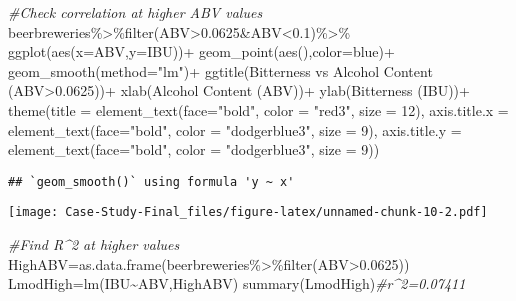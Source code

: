 \documentclass[
]{article}
\newenvironment{Shaded}{\begin{snugshade}}{\end{snugshade}}
\newcommand{\AttributeTok}[1]{\textcolor[rgb]{0.77,0.63,0.00}{#1}}
\newcommand{\CommentTok}[1]{\textcolor[rgb]{0.56,0.35,0.01}{\textit{#1}}}
\newcommand{\DecValTok}[1]{\textcolor[rgb]{0.00,0.00,0.81}{#1}}
\newcommand{\FloatTok}[1]{\textcolor[rgb]{0.00,0.00,0.81}{#1}}
\newcommand{\FunctionTok}[1]{\textcolor[rgb]{0.00,0.00,0.00}{#1}}
\newcommand{\NormalTok}[1]{#1}
\newcommand{\OtherTok}[1]{\textcolor[rgb]{0.56,0.35,0.01}{#1}}
\newcommand{\SpecialCharTok}[1]{\textcolor[rgb]{0.00,0.00,0.00}{#1}}
\newcommand{\StringTok}[1]{\textcolor[rgb]{0.31,0.60,0.02}{#1}}
\begin{document}
\begin{Shaded}
\begin{Highlighting}[]
\CommentTok{\#Check correlation at higher ABV values}
\NormalTok{beerbreweries}\SpecialCharTok{\%\textgreater{}\%}\FunctionTok{filter}\NormalTok{(ABV}\SpecialCharTok{\textgreater{}}\FloatTok{0.0625}\SpecialCharTok{\&}\NormalTok{ABV}\SpecialCharTok{\textless{}}\FloatTok{0.1}\NormalTok{)}\SpecialCharTok{\%\textgreater{}\%}
  \FunctionTok{ggplot}\NormalTok{(}\FunctionTok{aes}\NormalTok{(}\AttributeTok{x=}\NormalTok{ABV,}\AttributeTok{y=}\NormalTok{IBU))}\SpecialCharTok{+}
  \FunctionTok{geom\_point}\NormalTok{(}\FunctionTok{aes}\NormalTok{(),}\AttributeTok{color=}\StringTok{\textquotesingle{}blue\textquotesingle{}}\NormalTok{)}\SpecialCharTok{+}
  \FunctionTok{geom\_smooth}\NormalTok{(}\AttributeTok{method=}\StringTok{"lm"}\NormalTok{)}\SpecialCharTok{+}
  \FunctionTok{ggtitle}\NormalTok{(}\StringTok{\textquotesingle{}Bitterness vs Alcohol Content (ABV\textgreater{}0.0625)\textquotesingle{}}\NormalTok{)}\SpecialCharTok{+}
  \FunctionTok{xlab}\NormalTok{(}\StringTok{\textquotesingle{}Alcohol Content (ABV)\textquotesingle{}}\NormalTok{)}\SpecialCharTok{+}
  \FunctionTok{ylab}\NormalTok{(}\StringTok{\textquotesingle{}Bitterness (IBU)\textquotesingle{}}\NormalTok{)}\SpecialCharTok{+}
  \FunctionTok{theme}\NormalTok{(}\AttributeTok{title =} \FunctionTok{element\_text}\NormalTok{(}\AttributeTok{face=}\StringTok{"bold"}\NormalTok{, }\AttributeTok{color =} \StringTok{"red3"}\NormalTok{, }\AttributeTok{size =} \DecValTok{12}\NormalTok{),}
        \AttributeTok{axis.title.x =} \FunctionTok{element\_text}\NormalTok{(}\AttributeTok{face=}\StringTok{"bold"}\NormalTok{, }\AttributeTok{color =} \StringTok{"dodgerblue3"}\NormalTok{, }\AttributeTok{size =} \DecValTok{9}\NormalTok{),}
        \AttributeTok{axis.title.y =} \FunctionTok{element\_text}\NormalTok{(}\AttributeTok{face=}\StringTok{"bold"}\NormalTok{, }\AttributeTok{color =} \StringTok{"dodgerblue3"}\NormalTok{, }\AttributeTok{size =} \DecValTok{9}\NormalTok{))}
\end{Highlighting}
\end{Shaded}

\begin{verbatim}
## `geom_smooth()` using formula 'y ~ x'
\end{verbatim}

\texttt{[image: Case-Study-Final\_files/figure-latex/unnamed-chunk-10-2.pdf]}

\begin{Shaded}
\begin{Highlighting}[]
\CommentTok{\#Find R\^{}2 at higher values}
\NormalTok{HighABV}\OtherTok{=}\FunctionTok{as.data.frame}\NormalTok{(beerbreweries}\SpecialCharTok{\%\textgreater{}\%}\FunctionTok{filter}\NormalTok{(ABV}\SpecialCharTok{\textgreater{}}\FloatTok{0.0625}\NormalTok{))}
\NormalTok{LmodHigh}\OtherTok{=}\FunctionTok{lm}\NormalTok{(IBU}\SpecialCharTok{\textasciitilde{}}\NormalTok{ABV,HighABV)}
\FunctionTok{summary}\NormalTok{(LmodHigh)}\CommentTok{\#r\^{}2=0.07411}
\end{Highlighting}
\end{Shaded}
\end{document}

